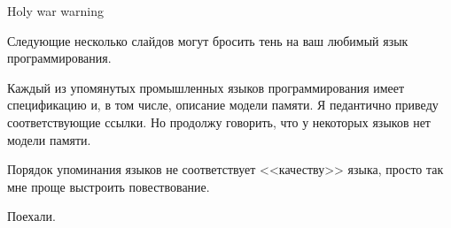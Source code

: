 \begin{frame}{Holy war warning}

Следующие несколько слайдов могут бросить тень на ваш любимый язык программирования.

\pause

Каждый из упомянутых промышленных языков программирования имеет спецификацию и, в том числе, описание модели памяти. Я педантично приведу соответствующие ссылки.
Но продолжу говорить, что у некоторых языков нет модели памяти.

\pause
\pause

Порядок упоминания языков не соответствует <<качеству>> языка, просто так мне проще выстроить повествование.

\pause

Поехали.

\end{frame}





